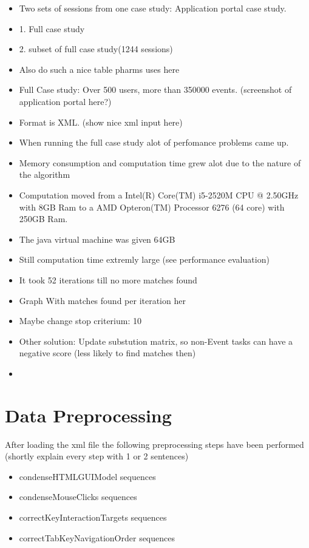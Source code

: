 \begin{itemize}
	\item Two sets of sessions from one case study: Application portal case study. 
	\item 1. Full case study
	\item 2. subset of full case study(1244 sessions)
	\item Also do such a nice table pharms uses here
	\item Full Case study: Over 500 users, more than 350000 events. (screenshot of application portal here?)
	\item Format is XML. (show nice xml input here)
	\item When running the full case study alot of perfomance problems came up.
	\item Memory consumption and computation time grew alot due to the nature of the algorithm
	\item Computation moved from a Intel(R) Core(TM) i5-2520M CPU @ 2.50GHz with 8GB Ram to a AMD Opteron(TM) Processor 6276 (64 core) with 250GB Ram.
	\item The java virtual machine was given 64GB
	\item Still computation time extremly large (see performance evaluation)
	\item It took 52 iterations till no more matches found
	\item Graph With matches found per iteration her
	\item Maybe change stop criterium: 10%
	\item Other solution: Update substution matrix, so non-Event tasks can have a negative score (less likely to find matches then)
	\item 
\end{itemize} 

\section{Data Preprocessing}
After loading the xml file the following preprocessing steps have been performed (shortly explain every step with 1 or 2 sentences)
\begin{itemize}
	\item condenseHTMLGUIModel sequences
	\item condenseMouseClicks sequences
	\item correctKeyInteractionTargets sequences
	\item correctTabKeyNavigationOrder sequences
\end{itemize}

